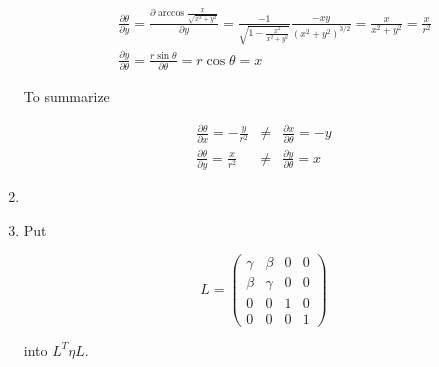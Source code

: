 \documentclass[12pt,a4paper]{article}
\begin{document}
\begin{enumerate}
\begin{eqnarray*}
&& \frac{ \partial \theta }{ \partial y } = \frac{ \partial\arccos{\frac{x}{\sqrt{x^2+y^2}} } }{ \partial y } = \frac{-1}{\sqrt{1 - \frac{x^2}{x^2+y^2} }} \frac{-xy}{(x^2+y^2)^{3/2}} = \frac{x}{x^2+y^2} = \frac{x}{r^2} \\
&& \frac{ \partial y }{ \partial \theta } = \frac{ r\sin\theta }{ \partial \theta } = r\cos\theta = x
\end{eqnarray*}

To summarize

\begin{eqnarray*}
\frac{\partial \theta}{\partial x} =-\frac{y}{r^2} &\neq& \frac{\partial x}{\partial\theta} = -y \\
\frac{\partial \theta}{\partial y} = \frac{x}{r^2} &\neq& \frac{\partial y}{\partial\theta} =  x
\end{eqnarray*}



\item



\item

Put 

\begin{equation}
L =  
	\begin{pmatrix}
\gamma & \beta & 0 & 0 \\
\beta & \gamma & 0  & 0 \\
0 & 0 & 1 & 0 \\
0 & 0 & 0 & 1
	\end{pmatrix}
\end{equation}

into $L^T \eta L$.


\end{enumerate}
\end{document}
